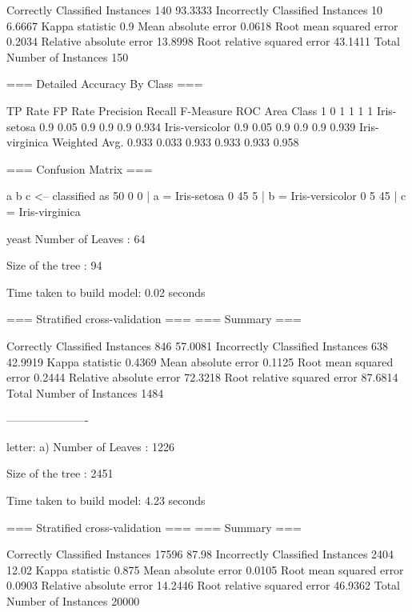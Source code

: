 Correctly Classified Instances         140               93.3333 %
Incorrectly Classified Instances        10                6.6667 %
Kappa statistic                          0.9   
Mean absolute error                      0.0618
Root mean squared error                  0.2034
Relative absolute error                 13.8998 %
Root relative squared error             43.1411 %
Total Number of Instances              150     

=== Detailed Accuracy By Class ===

               TP Rate   FP Rate   Precision   Recall  F-Measure   ROC Area  Class
                 1         0          1         1         1          1        Iris-setosa
                 0.9       0.05       0.9       0.9       0.9        0.934    Iris-versicolor
                 0.9       0.05       0.9       0.9       0.9        0.939    Iris-virginica
Weighted Avg.    0.933     0.033      0.933     0.933     0.933      0.958

=== Confusion Matrix ===

  a  b  c   <-- classified as
 50  0  0 |  a = Iris-setosa
  0 45  5 |  b = Iris-versicolor
  0  5 45 |  c = Iris-virginica

yeast
Number of Leaves  : 	64

Size of the tree : 	94


Time taken to build model: 0.02 seconds

=== Stratified cross-validation ===
=== Summary ===

Correctly Classified Instances         846               57.0081 %
Incorrectly Classified Instances       638               42.9919 %
Kappa statistic                          0.4369
Mean absolute error                      0.1125
Root mean squared error                  0.2444
Relative absolute error                 72.3218 %
Root relative squared error             87.6814 %
Total Number of Instances             1484     





----------------------

letter:
a)
Number of Leaves  : 	1226

Size of the tree : 	2451


Time taken to build model: 4.23 seconds

=== Stratified cross-validation ===
=== Summary ===

Correctly Classified Instances       17596               87.98   %
Incorrectly Classified Instances      2404               12.02   %
Kappa statistic                          0.875 
Mean absolute error                      0.0105
Root mean squared error                  0.0903
Relative absolute error                 14.2446 %
Root relative squared error             46.9362 %
Total Number of Instances            20000     


